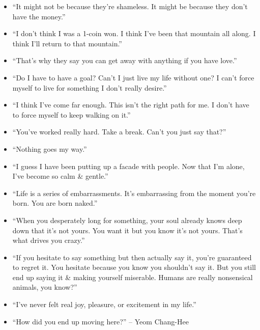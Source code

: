 \documentclass{article}
\numberwithin{equation}{section}
\begin{document}
\begin{enumerate}
\begin{itemize}
		\item ``It might not be because they're shameless. It might be because they don't have the money.''
		\item ``I don't think I was a 1-coin won. I think I've been that mountain all along. I think I'll return to that mountain.''
		\item ``That's why they say you can get away with anything if you have love.''
		\item ``Do I have to have a goal? Can't I just live my life without one? I can't force myself to live for something I don't really desire.''
		\item ``I think I've come far enough. This isn't the right path for me. I don't have to force myself to keep walking on it.''
		\item ``You've worked really hard. Take a break. Can't you just say that?''
		\item ``Nothing goes my way.''
		\item ``I guess I have been putting up a facade with people. Now that I'm alone, I've become so calm \& gentle.''
		\item ``Life is a series of embarrassments. It's embarrassing from the moment you're born. You are born naked.''
		\item ``When you desperately long for something, your soul already knows deep down that it's not yours. You want it but you know it's not yours. That's what drives you crazy.''
		\item ``If you hesitate to say something but then actually say it, you're guaranteed to regret it. You hesitate because you know you shouldn't say it. But you still end up saying it \& making yourself miserable. Humans are really nonsensical animals, you know?''
		\item ``I've never felt real joy, pleasure, or excitement in my life.''
		\item ``How did you end up moving here?'' -- Yeom Chang-Hee
		

\end{itemize}
\end{enumerate}
\end{document}
